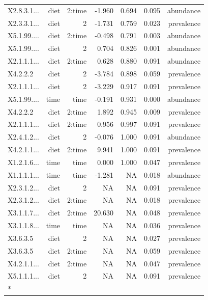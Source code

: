 \documentclass[
  letterpaper,
  DIV=11,
  numbers=noendperiod]{scrartcl}
\begin{document}
\begin{longtable}[t]{lrrrrrr}
X2.8.3.1... & diet & 2:time & -1.960 & 0.694 & 0.095 & abundance\\
\addlinespace
X2.3.3.1... & diet & 2 & -1.731 & 0.759 & 0.023 & prevalence\\
X5.1.99.... & diet & 2:time & -0.498 & 0.791 & 0.003 & abundance\\
X5.1.99.... & diet & 2 & 0.704 & 0.826 & 0.001 & abundance\\
X2.1.1.1... & diet & 2:time & 0.628 & 0.880 & 0.091 & abundance\\
X4.2.2.2 & diet & 2 & -3.784 & 0.898 & 0.059 & prevalence\\
\addlinespace
X2.1.1.1... & diet & 2 & -3.229 & 0.917 & 0.091 & prevalence\\
X5.1.99.... & time & time & -0.191 & 0.931 & 0.000 & abundance\\
X4.2.2.2 & diet & 2:time & 1.892 & 0.945 & 0.009 & prevalence\\
X2.1.1.1... & diet & 2:time & 0.956 & 0.997 & 0.091 & prevalence\\
X2.4.1.2... & diet & 2 & -0.076 & 1.000 & 0.091 & abundance\\
\addlinespace
X4.2.1.1... & diet & 2:time & 9.941 & 1.000 & 0.091 & prevalence\\
X1.2.1.6... & time & time & 0.000 & 1.000 & 0.047 & prevalence\\
X1.1.1.1... & time & time & -1.281 & NA & 0.018 & abundance\\
X2.3.1.2... & diet & 2 & NA & NA & 0.091 & prevalence\\
X2.3.1.2... & diet & 2:time & NA & NA & 0.018 & prevalence\\
\addlinespace
X3.1.1.7... & diet & 2:time & 20.630 & NA & 0.048 & prevalence\\
X3.1.1.8... & time & time & NA & NA & 0.036 & prevalence\\
X3.6.3.5 & diet & 2 & NA & NA & 0.027 & prevalence\\
X3.6.3.5 & diet & 2:time & NA & NA & 0.059 & prevalence\\
X4.2.1.1... & diet & 2:time & NA & NA & 0.047 & prevalence\\
\addlinespace
X5.1.1.1... & diet & 2 & NA & NA & 0.091 & prevalence\\*
\end{longtable}
\end{document}
